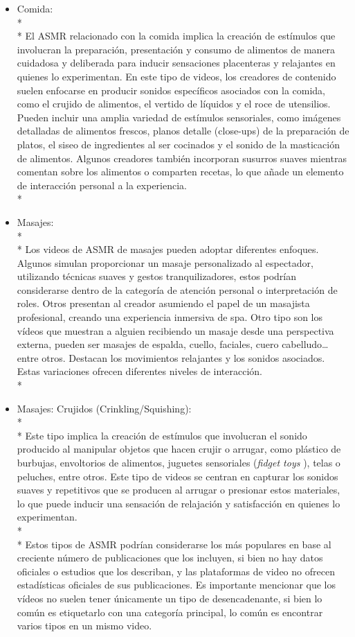 \documentclass[a4paper,12pt,twoside]{memoir}
\begin{document}
\begin{itemize}
\begin{itemize}
    \item Comida:\\*\\* El ASMR relacionado con la comida implica la creación de estímulos que involucran la preparación, presentación y consumo de alimentos de manera cuidadosa y deliberada para inducir sensaciones placenteras y relajantes en quienes lo experimentan. En este tipo de videos, los creadores de contenido suelen enfocarse en producir sonidos específicos asociados con la comida, como el crujido de alimentos, el vertido de líquidos y el roce de utensilios. Pueden incluir una amplia variedad de estímulos sensoriales, como imágenes detalladas de alimentos frescos, planos detalle (close-ups) de la preparación de platos, el siseo de ingredientes al ser cocinados y el sonido de la masticación de alimentos. Algunos creadores también incorporan susurros suaves mientras comentan sobre los alimentos o comparten recetas, lo que añade un elemento de interacción personal a la experiencia.\\*
    \item Masajes:\\*\\* Los videos de ASMR de masajes pueden adoptar diferentes enfoques. Algunos simulan proporcionar un masaje personalizado al espectador, utilizando técnicas suaves y gestos tranquilizadores, estos podrían considerarse dentro de la categoría de atención personal o interpretación de roles. Otros presentan al creador asumiendo el papel de un masajista profesional, creando una experiencia inmersiva de spa. Otro tipo son los vídeos que muestran a alguien recibiendo un masaje desde una perspectiva externa, pueden ser masajes de espalda, cuello, faciales, cuero cabelludo… entre otros. Destacan los movimientos relajantes y los sonidos asociados. Estas variaciones ofrecen diferentes niveles de interacción.\\*
    \item Masajes: Crujidos (Crinkling/Squishing):\\*\\* Este tipo implica la creación de estímulos que involucran el sonido producido al manipular objetos que hacen crujir o arrugar, como plástico de burbujas, envoltorios de alimentos, juguetes sensoriales (\textit{fidget toys}
), telas o peluches, entre otros. Este tipo de videos se centran en capturar los sonidos suaves y repetitivos que se producen al arrugar o presionar estos materiales, lo que puede inducir una sensación de relajación y satisfacción en quienes lo experimentan.\\*\\* 
    \text Estos tipos de ASMR podrían considerarse los más populares en base al creciente número de publicaciones que los incluyen, si bien no hay datos oficiales o estudios que los describan, y las plataformas de video no ofrecen estadísticas oficiales de sus publicaciones. Es importante mencionar que los vídeos no suelen tener únicamente un tipo de desencadenante, si bien lo común es etiquetarlo con una categoría principal, lo común es encontrar varios tipos en un mismo video.
    \end{itemize}

\end{itemize}
\end{document}
